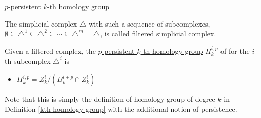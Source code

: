 \documentclass[xcolor={dvipsnames,svgnames}]{beamer}
\begin{document}

 

\begin{frame}{$p$-persistent $k$-th homology group}
\begin{defn}
\label{filtered}
The simplicial complex $\triangle$ with such a sequence of subcomplexes, $\emptyset \subseteq \triangle^1 \subseteq \triangle^2 \subseteq \cdots \subseteq \triangle^m = \triangle$, is called \underline{filtered simplicial complex}.
\end{defn}
\begin{defn}
Given a filtered complex, the \underline{$p$-persistent $k$-th homology group} $H_k^{i,p}$ of for the $i$-th subcomplex $\triangle^i$ is 
\begin{itemize}
    \item $H_k^{i,p} = Z_k^i / (B_k^{i+p}\cap Z_k^i)$
\end{itemize}
\end{defn}
Note that this is simply the definition of homology group of degree $k$ in Definition \ref{kth-homology-group} with the additional notion of persistence.
\end{frame}
\end{document}
